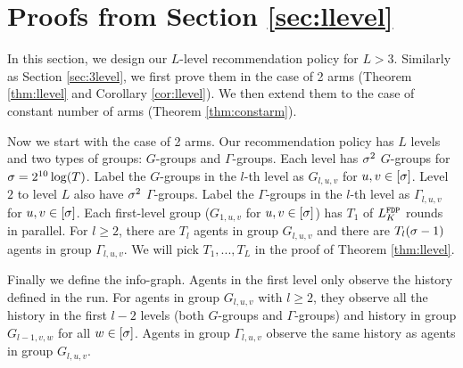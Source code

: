 
\section{Proofs from Section \ref{sec:llevel}}
\label{sec:llevel-details}
In this section, we design our $L$-level recommendation policy for $L > 3$. Similarly as Section \ref{sec:3level}, we first prove them in the case of 2 arms (Theorem \ref{thm:llevel} and Corollary \ref{cor:llevel}). We then extend them to the case of constant number of arms (Theorem \ref{thm:constarm}). 

Now we start with the case of 2 arms. Our recommendation policy has $L$ levels and two types of groups: $G$-groups and $\Gamma$-groups. Each level has $\sigma^2$ $G$-groups for $\sigma = 2^{10}\log(T)$. Label the $G$-groups in the $l$-th level as $G_{l,u,v}$ for $u,v \in [\sigma]$. Level $2$ to level $L$ also have $\sigma^2$ $\Gamma$-groups. Label the $\Gamma$-groups in the $l$-th level as $\Gamma_{l,u,v}$ for $u,v \in [\sigma]$. Each first-level group ($G_{1,u,v}$ for $u,v\in [\sigma]$) has $T_1$ \ALGG of $L^\mathtt{FDP}_K$ rounds in parallel. For $l \geq 2$, there are $T_l$ agents in group $G_{l,u,v}$ and there are $T_l (\sigma-1)$ agents in group $\Gamma_{l,u,v}$. We will pick $T_1,...,T_L$ in the proof of Theorem \ref{thm:llevel}.

Finally we define the info-graph. Agents in the first level only observe the history defined in the \ALGG run. For agents in group $G_{l,u,v}$ with $l\geq 2$, they observe all the history in the first $l-2$ levels (both $G$-groups and $\Gamma$-groups) and history in group $G_{l-1,v,w}$ for all $w \in [\sigma]$. Agents in group $\Gamma_{l,u,v}$ observe the same history as agents in group $G_{l,u,v}$.
 
